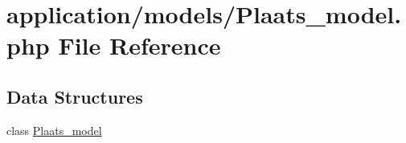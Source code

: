 \hypertarget{_plaats__model_8php}{}\section{application/models/\+Plaats\+\_\+model.php File Reference}
\label{_plaats__model_8php}
\subsection*{Data Structures}
\begin{DoxyCompactItemize}
\item 
class \mbox{\hyperlink{class_plaats__model}{Plaats\+\_\+model}}
\end{DoxyCompactItemize}
